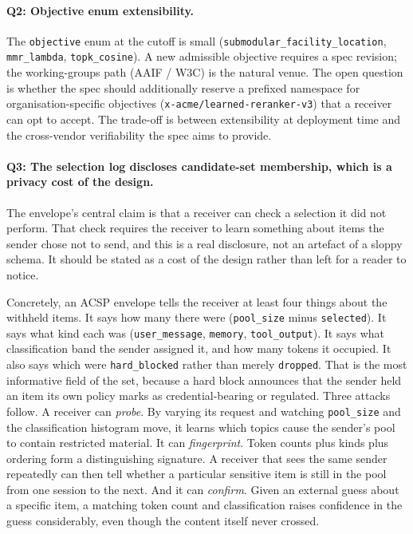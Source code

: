 \paragraph{Q2: Objective enum extensibility.}
The \texttt{objective} enum at the cutoff is small
(\texttt{submodular\_\allowbreak{}facility\_\allowbreak{}location},
\texttt{mmr\_lambda}, \texttt{topk\_cosine}). A new
admissible objective requires a spec revision; the
working-groups path (AAIF / W3C) is the natural venue.
The open question is whether the spec should additionally
reserve a prefixed namespace for organisation-specific
objectives
(\texttt{x-acme/learned-reranker-v3}) that a receiver
can opt to accept. The trade-off is between
extensibility at deployment time and the cross-vendor
verifiability the spec aims to provide.

\paragraph{Q3: The selection log discloses candidate-set
membership, which is a privacy cost of the design.}
The envelope's central claim is that a receiver can check a
selection it did not perform. That check requires the
receiver to learn something about items the sender chose not
to send, and this is a real disclosure, not an artefact of a
sloppy schema. It should be stated as a cost of the design
rather than left for a reader to notice.

Concretely, an ACSP envelope tells the receiver at least
four things about the withheld items. It says how many there
were (\texttt{pool\_size} minus \texttt{selected}). It says
what kind each was (\texttt{user\_message}, \texttt{memory},
\texttt{tool\_output}). It says what classification band the
sender assigned it, and how many tokens it occupied. It also
says which were \texttt{hard\_blocked} rather than merely
\texttt{dropped}. That is the most informative field of the
set, because a hard block announces that the sender held an
item its own policy marks as credential-bearing or regulated.
Three attacks follow. A receiver can \emph{probe}. By varying
its request and watching \texttt{pool\_size} and the
classification histogram move, it learns which topics cause
the sender's pool to contain restricted material. It can
\emph{fingerprint}. Token counts plus kinds plus ordering
form a distinguishing signature. A receiver that sees the
same sender repeatedly can then tell whether a particular
sensitive item is still in the pool from one session to the
next. And it can \emph{confirm}. Given an external guess
about a specific item, a matching token count and
classification raises confidence in the guess considerably,
even though the content itself never crossed.

